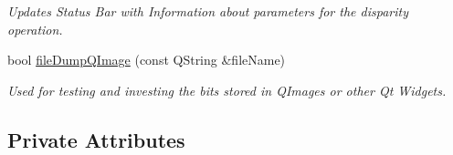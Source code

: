 \begin{CompactItemize}
\begin{CompactList}\small\item\em Updates Status Bar with Information about parameters for the disparity operation. \item\end{CompactList}\item 
bool \hyperlink{classQcorr_87229fc918fa4011e96fbadb325fd52e}{fileDumpQImage} (const QString \&fileName)
\begin{CompactList}\small\item\em Used for testing and investing the bits stored in QImages or other Qt Widgets. \item\end{CompactList}\end{CompactItemize}
\subsection*{Private Attributes}

